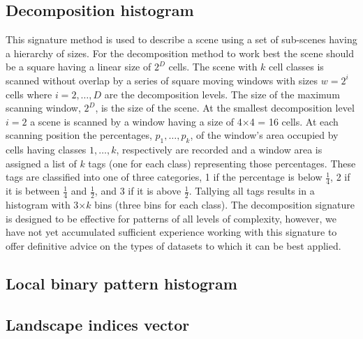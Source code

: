 \subsection{Decomposition histogram}

This signature method is 
used to describe a scene using a set of sub-scenes having a hierarchy of sizes. 
For the decomposition method to work best the scene should be a square having a linear size of $2^{D}$ cells.
The scene with $k$ cell classes is scanned without overlap by a series of square moving windows with sizes $w=2^{i}$ cells where $i=2, \ldots, D$ are the decomposition levels. 
The size of the maximum scanning window, $2^D$, is the size of the scene. 
At the smallest decomposition level $i=2$ a scene is scanned by a window having a size of 4$\times$4 = 16 cells. 
At each scanning position the percentages, ${p_1, \ldots, p_k}$, of the window's area occupied by cells having classes ${1, \ldots, k}$, respectively are recorded and a window area is assigned a list of $k$ tags (one for each class) representing those percentages. 
These tags are classified into one of three categories, 1 if the percentage is below $\frac{1}{4}$, 2 if it is between $\frac{1}{4}$ and $\frac{1}{2}$, and 3 if it is above $\frac{1}{2}$. 
Tallying all tags results in a histogram with 3$\times k$ bins (three bins for each class).  
The decomposition signature is designed to be effective for patterns of all levels of complexity, however, we have not yet accumulated sufficient experience working with this signature to offer definitive advice on the types of datasets to which it can be best applied. 

\subsection{Local binary pattern histogram}

\subsection{Landscape indices vector}
